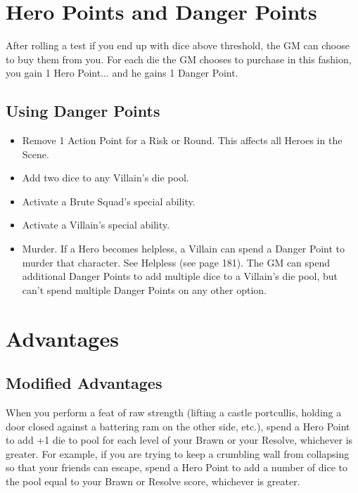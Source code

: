 \documentclass[10pt,twoside,openany]{book}
\begin{document}
	\section{Hero Points and Danger Points}
	
	After rolling a test if you end up with dice above threshold, the GM can choose
	to buy them from you. For each die the GM chooses
	to purchase in this fashion, you gain 1 Hero Point...
	and he gains 1 Danger Point.
	
	\subsection{Using Danger Points}
	\begin{itemize}
		\item Remove 1 Action Point for
		a Risk or Round. This affects all Heroes in
		the Scene.
		\item Add two dice to any Villain’s die pool.
		\item Activate a Brute Squad’s special ability.
		\item Activate a Villain’s special ability.
		\item Murder. If a Hero becomes helpless, a Villain
		can spend a Danger Point to murder that
		character. See Helpless (see page 181).
		The GM can spend additional Danger Points to add
		multiple dice to a Villain’s die pool, but can’t spend
		multiple Danger Points on any other option.
	\end{itemize}
	
	
	\section{Advantages}
	
	\subsection{Modified Advantages}
	
	When you perform a feat of raw strength (lifting
	a castle portcullis, holding a door closed against a
	battering ram on the other side, etc.), spend a Hero
	Point to add +1 die to pool
	for each level of your Brawn or your Resolve, whichever is
	greater. For example, if you are trying to keep a crumbling wall from collapsing so that your friends can
	escape, spend a Hero Point to add a number of dice to the pool equal to your Brawn or Resolve score, whichever is greater.
	
\end{document}
